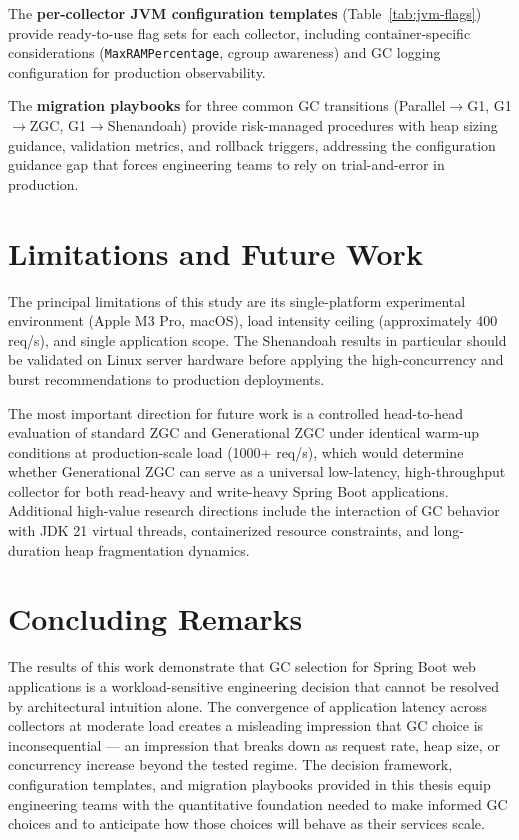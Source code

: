 The \textbf{per-collector JVM configuration templates} (Table~\ref{tab:jvm-flags}) provide ready-to-use flag sets for each collector, including container-specific considerations (\texttt{MaxRAMPercentage}, cgroup awareness) and GC logging configuration for production observability.

The \textbf{migration playbooks} for three common GC transitions (Parallel$\rightarrow$G1, G1$\rightarrow$ZGC, G1$\rightarrow$Shenandoah) provide risk-managed procedures with heap sizing guidance, validation metrics, and rollback triggers, addressing the configuration guidance gap that forces engineering teams to rely on trial-and-error in production.

\section*{Limitations and Future Work}

The principal limitations of this study are its single-platform experimental environment (Apple M3 Pro, macOS), load intensity ceiling (approximately 400\,req/s), and single application scope. The Shenandoah results in particular should be validated on Linux server hardware before applying the high-concurrency and burst recommendations to production deployments.

The most important direction for future work is a controlled head-to-head evaluation of standard ZGC and Generational ZGC under identical warm-up conditions at production-scale load (1000+ req/s), which would determine whether Generational ZGC can serve as a universal low-latency, high-throughput collector for both read-heavy and write-heavy Spring Boot applications. Additional high-value research directions include the interaction of GC behavior with JDK 21 virtual threads, containerized resource constraints, and long-duration heap fragmentation dynamics.

\section*{Concluding Remarks}

The results of this work demonstrate that GC selection for Spring Boot web applications is a workload-sensitive engineering decision that cannot be resolved by architectural intuition alone. The convergence of application latency across collectors at moderate load creates a misleading impression that GC choice is inconsequential --- an impression that breaks down as request rate, heap size, or concurrency increase beyond the tested regime. The decision framework, configuration templates, and migration playbooks provided in this thesis equip engineering teams with the quantitative foundation needed to make informed GC choices and to anticipate how those choices will behave as their services scale.

